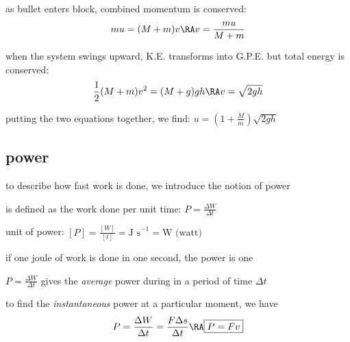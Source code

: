 
\sol as bullet enters block, combined momentum is conserved:
\begin{equation*}
	mu = (M+m)v \RA v = \frac{mu}{M+m}
\end{equation*}

when the system swings upward, K.E. transforms into G.P.E. but total energy is conserved:
\begin{equation*}
\frac{1}{2}(M+m)v^2 = (M+g)gh \RA v = \sqrt{2gh}
\end{equation*}

putting the two equations together, we find: $ u = \left(1+\frac{M}{m}\right)\sqrt{2gh} $ \eoe








\subsection{power}

to describe how fast work is done, we introduce the notion of power

\begin{ilight}
	 is defined as the work done per unit time: $\boxed{P = \frac{\Delta W}{\Delta t}}$  
\end{ilight}

\cmt unit of power: $[P]  = \frac{[W]}{[t]} = \text{J s}^{-1} = \text{W (watt)}$

if one joule of work is done in one second, the power is one 

\cmt $P = \frac{\Delta W}{\Delta t}$ gives the \emph{average} power during in a period of time $\Delta t$

to find the \emph{instantaneous} power at a particular moment, we have
\begin{equation*}
P = \frac{\Delta W}{\Delta t} = \frac{F \Delta s}{\Delta t} \RA \boxed{P=Fv}
\end{equation*}


